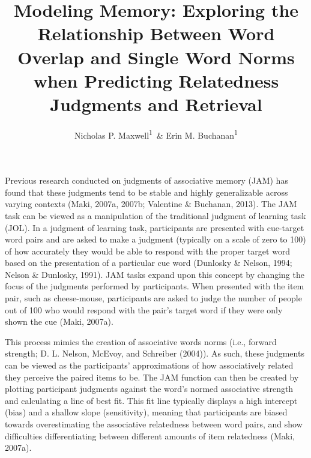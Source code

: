\documentclass[english,man]{apa6}
\title{Modeling Memory: Exploring the Relationship Between Word Overlap and
Single Word Norms when Predicting Relatedness Judgments and Retrieval}
\author{Nicholas P. Maxwell\textsuperscript{1}~\& Erin M. Buchanan\textsuperscript{1}}
\affiliation{
    \vspace{0.5cm}
          \textsuperscript{1} Missouri State University  }
\theoremstyle{definition}
\theoremstyle{definition}
\theoremstyle{definition}
\theoremstyle{remark}
\begin{document}
\maketitle

\setcounter{secnumdepth}{0}



Previous research conducted on judgments of associative memory (JAM) has
found that these judgments tend to be stable and highly generalizable
across varying contexts (Maki, 2007a, 2007b; Valentine \& Buchanan,
2013). The JAM task can be viewed as a manipulation of the traditional
judgment of learning task (JOL). In a judgment of learning task,
participants are presented with cue-target word pairs and are asked to
make a judgment (typically on a scale of zero to 100) of how accurately
they would be able to respond with the proper target word based on the
presentation of a particular cue word (Dunlosky \& Nelson, 1994; Nelson
\& Dunlosky, 1991). JAM tasks expand upon this concept by changing the
focus of the judgments performed by participants. When presented with
the item pair, such as cheese-mouse, participants are asked to judge the
number of people out of 100 who would respond with the pair's target
word if they were only shown the cue (Maki, 2007a).

This process mimics the creation of associative words norms (i.e.,
forward strength; D. L. Nelson, McEvoy, and Schreiber (2004)). As such,
these judgments can be viewed as the participants' approximations of how
associatively related they perceive the paired items to be. The JAM
function can then be created by plotting participant judgments against
the word's normed associative strength and calculating a line of best
fit. This fit line typically displays a high intercept (bias) and a
shallow slope (sensitivity), meaning that participants are biased
towards overestimating the associative relatedness between word pairs,
and show difficulties differentiating between different amounts of item
relatedness (Maki, 2007a).
\end{document}
